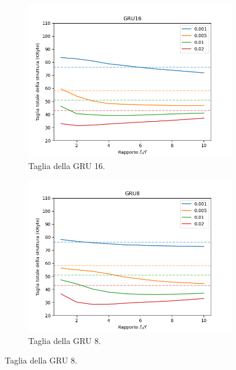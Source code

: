 \documentclass[../../main.tex]{subfiles}
\begin{document}
    \begin{figure}[H]
        \centering
        \begin{subfigure}[b]{0.32\textwidth}
            \centering
            \includegraphics[width = \textwidth]{immagini/7/SLBF/GRU16_Taglia.png}
            \caption{Taglia della GRU 16.}
            \label{fig:SLBFTagliaGRU16}
        \end{subfigure}
        \begin{subfigure}[b]{0.32\textwidth}
            \centering
            \includegraphics[width = \textwidth]{immagini/7/SLBF/GRU8_Taglia.png}
            \caption{Taglia della GRU 8.}
            \label{fig:SLBFTagliaGRU8}
        \end{subfigure}

\end{figure}
\end{document}
